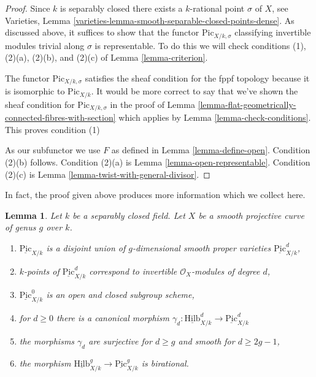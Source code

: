 \documentclass{stacks-project}
\theoremstyle{plain}
\newtheorem{lemma}[subsection]{Lemma}
\theoremstyle{definition}
\theoremstyle{remark}
\numberwithin{equation}{subsection}
\def\Hilbfunctor{\mathrm{Hilb}}
\def\Picardfunctor{\mathrm{Pic}}
\begin{document}
\begin{proof}
Since $k$ is separably closed there exists a $k$-rational point $\sigma$
of $X$, see
Varieties, Lemma \ref{varieties-lemma-smooth-separable-closed-points-dense}.
As discussed above, it suffices to show that the functor
$\Picardfunctor_{X/k, \sigma}$ classifying invertible modules trivial along
$\sigma$ is representable. To do this we will check conditions (1),
(2)(a), (2)(b), and (2)(c) of
Lemma \ref{lemma-criterion}.

\medskip\noindent
The functor $\Picardfunctor_{X/k, \sigma}$ satisfies the sheaf condition
for the fppf topology because it is isomorphic to $\Picardfunctor_{X/k}$.
It would be more correct to say that we've shown the sheaf condition
for $\Picardfunctor_{X/k, \sigma}$ in the proof of
Lemma \ref{lemma-flat-geometrically-connected-fibres-with-section}
which applies by Lemma \ref{lemma-check-conditions}.
This proves condition (1)

\medskip\noindent
As our subfunctor we use $F$ as defined in Lemma \ref{lemma-define-open}.
Condition (2)(b) follows.
Condition (2)(a) is Lemma \ref{lemma-open-representable}.
Condition (2)(c) is Lemma \ref{lemma-twist-with-general-divisor}.
\end{proof}

\noindent
In fact, the proof given above produces more information which we
collect here.

\begin{lemma}
\label{lemma-picard-pieces}
Let $k$ be a separably closed field. Let $X$ be a smooth projective
curve of genus $g$ over $k$.
\begin{enumerate}
\item $\underline{\Picardfunctor}_{X/k}$ is a disjoint union of
$g$-dimensional smooth proper varieties $\underline{\Picardfunctor}^d_{X/k}$,
\item $k$-points of $\underline{\Picardfunctor}^d_{X/k}$
correspond to invertible $\mathcal{O}_X$-modules of degree $d$,
\item $\underline{\Picardfunctor}^0_{X/k}$
is an open and closed subgroup scheme,
\item for $d \geq 0$ there is a canonical morphism
$\gamma_d :
\underline{\Hilbfunctor}^d_{X/k} \to \underline{\Picardfunctor}^d_{X/k}$
\item the morphisms $\gamma_d$
are surjective for $d \geq g$ and smooth for $d \geq 2g - 1$,
\item the morphism
$\underline{\Hilbfunctor}^g_{X/k} \to \underline{\Picardfunctor}^g_{X/k}$
is birational.
\end{enumerate}
\end{lemma}
\end{document}
